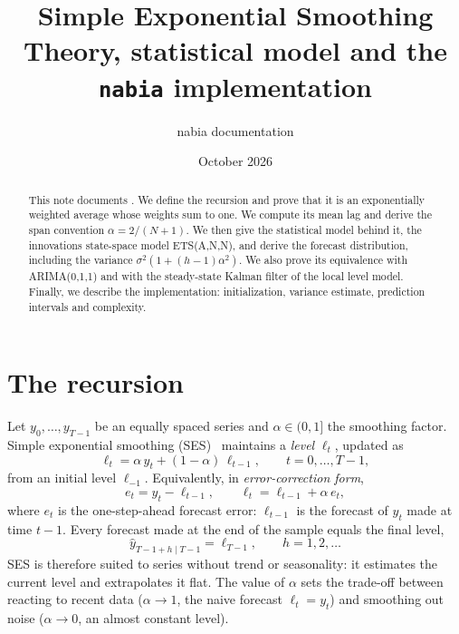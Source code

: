 \documentclass[11pt,a4paper]{article}
\title{Simple Exponential Smoothing\\[0.3em]\large Theory, statistical model and the \texttt{nabia} implementation}
\author{nabia documentation}
\date{October 2026}
\begin{document}
\maketitle

\begin{abstract}
This note documents . We
define the recursion and prove that it is an exponentially weighted average whose
weights sum to one. We compute its mean lag and derive the span
convention $\alpha=2/(N+1)$. We then give the statistical model behind it, the
innovations state-space model ETS(A,N,N), and derive the forecast
distribution, including the variance $\sigma^2(1+(h-1)\alpha^2)$. We also prove
its equivalence with ARIMA(0,1,1) and with the steady-state Kalman filter of
the local level model. Finally, we describe the implementation: initialization,
variance estimate, prediction intervals and complexity.
\end{abstract}

\tableofcontents

\section{The recursion}

Let $y_0,\dots,y_{T-1}$ be an equally spaced series and $\alpha\in(0,1]$ the
smoothing factor. Simple exponential smoothing (SES)~\cite{brown1959} maintains a
\emph{level} $\ell_t$, updated as
\begin{equation}\label{eq:ses}
  \ell_t = \alpha\, y_t + (1-\alpha)\,\ell_{t-1},\qquad t=0,\dots,T-1,
\end{equation}
from an initial level $\ell_{-1}$. Equivalently, in \emph{error-correction form},
\begin{equation}\label{eq:error-correction}
  e_t = y_t - \ell_{t-1},\qquad \ell_t = \ell_{t-1} + \alpha\, e_t ,
\end{equation}
where $e_t$ is the one-step-ahead forecast error: $\ell_{t-1}$ is the forecast
of $y_t$ made at time $t-1$. Every forecast made at the end of the sample
equals the final level,
\[
  \hat y_{T-1+h\mid T-1} = \ell_{T-1},\qquad h=1,2,\dots
\]
SES is therefore suited to series without trend or seasonality: it estimates the
current level and extrapolates it flat. The value of $\alpha$ sets the trade-off
between reacting to recent data ($\alpha\to 1$, the naive forecast $\ell_t=y_t$)
and smoothing out noise ($\alpha\to 0$, an almost constant level).
\end{document}
